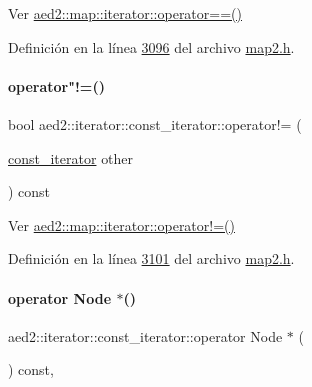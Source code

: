 Ver \hyperlink{classaed2_1_1map_1_1iterator_a34f6622845af93ca42f1be8516eeafa2_a34f6622845af93ca42f1be8516eeafa2}{aed2\+::map\+::iterator\+::operator==()} 



Definición en la línea \hyperlink{map2_8h_source_l03096}{3096} del archivo \hyperlink{map2_8h_source}{map2.\+h}.

\mbox{\label{classaed2_1_1iterator_1_1const__iterator_ac9d9eb5bae19cd792c4e92dcc0426e81_ac9d9eb5bae19cd792c4e92dcc0426e81}} 
\paragraph{\texorpdfstring{operator"!=()}{operator!=()}}
{\footnotesize\ttfamily bool aed2\+::iterator\+::const\+\_\+iterator\+::operator!= (\begin{DoxyParamCaption}\item[{\hyperlink{classaed2_1_1iterator_1_1const__iterator}{const\+\_\+iterator}}]{other }\end{DoxyParamCaption}) const\hspace{0.3cm}{\ttfamily [inline]}}



Ver \hyperlink{classaed2_1_1map_1_1iterator_a748cdf8c35707d1c2e9ef8ef9d862d37_a748cdf8c35707d1c2e9ef8ef9d862d37}{aed2\+::map\+::iterator\+::operator!=()} 



Definición en la línea \hyperlink{map2_8h_source_l03101}{3101} del archivo \hyperlink{map2_8h_source}{map2.\+h}.

\mbox{\label{classaed2_1_1iterator_1_1const__iterator_af7cb6596f89769b8aa654d3bbb7384ab_af7cb6596f89769b8aa654d3bbb7384ab}} 
\paragraph{\texorpdfstring{operator Node $\ast$()}{operator Node *()}}
{\footnotesize\ttfamily aed2\+::iterator\+::const\+\_\+iterator\+::operator Node $\ast$ (\begin{DoxyParamCaption}{ }\end{DoxyParamCaption}) const\hspace{0.3cm}{\ttfamily [inline]}, {\ttfamily [private]}}



